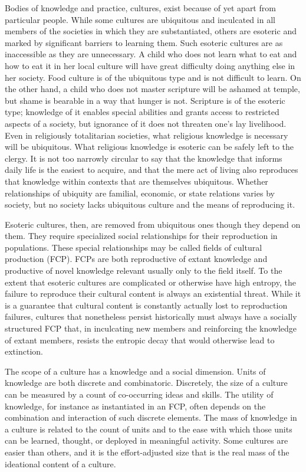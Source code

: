 \documentclass[]{book}
\theoremstyle{definition}
\theoremstyle{definition}
\theoremstyle{definition}
\theoremstyle{remark}
\begin{document}
Bodies of knowledge and practice, cultures, exist because of yet apart
from particular people. While some cultures are ubiquitous and
inculcated in all members of the societies in which they are
substantiated, others are esoteric and marked by significant barriers to
learning them. Such esoteric cultures are as inaccessible as they are
unnecessary. A child who does not learn what to eat and how to eat it in
her local culture will have great difficulty doing anything else in her
society. Food culture is of the ubiquitous type and is not difficult to
learn. On the other hand, a child who does not master scripture will be
ashamed at temple, but shame is bearable in a way that hunger is not.
Scripture is of the esoteric type; knowledge of it enables special
abilities and grants access to restricted aspects of a society, but
ignorance of it does not threaten one's lay livelihood. Even in
religiously totalitarian societies, what religious knowledge is
necessary will be ubiquitous. What religious knowledge is esoteric can
be safely left to the clergy. It is not too narrowly circular to say
that the knowledge that informs daily life is the easiest to acquire,
and that the mere act of living also reproduces that knowledge within
contexts that are themselves ubiquitous. Whether relationships of
ubiquity are familial, economic, or state relations varies by society,
but no society lacks ubiquitous culture and the means of reproducing it.

Esoteric cultures, then, are removed from ubiquitous ones though they
depend on them. They require specialized social relationships for their
reproduction in populations. These special relationships may be called
fields of cultural production (FCP). FCPs are both reproductive of
extant knowledge and productive of novel knowledge relevant usually only
to the field itself. To the extent that esoteric cultures are
complicated or otherwise have high entropy, the failure to reproduce
their cultural content is always an existential threat. While it is a
guarantee that cultural content is constantly actually lost to
reproduction failures, cultures that nonetheless persist historically
must always have a socially structured FCP that, in inculcating new
members and reinforcing the knowledge of extant members, resists the
entropic decay that would otherwise lead to extinction.

The scope of a culture has a knowledge and a social dimension. Units of
knowledge are both discrete and combinatoric. Discretely, the size of a
culture can be measured by a count of co-occurring ideas and skills. The
utility of knowledge, for instance as instantiated in an FCP, often
depends on the combination and interaction of such discrete elements.
The mass of knowledge in a culture is related to the count of units and
to the ease with which those units can be learned, thought, or deployed
in meaningful activity. Some cultures are easier than others, and it is
the effort-adjusted size that is the real mass of the ideational content
of a culture.
\end{document}
